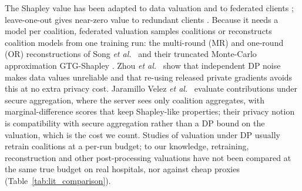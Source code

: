 \documentclass[journal]{IEEEtran}
\begin{document}
The Shapley value \cite{Shapley1953} has been adapted to data valuation \cite{Ghorbani2019DataShapley, Jia2019KNNShapley} and to federated clients \cite{Song2019BlockchainFL, Wei2020DataValuation, Lyu2020FairnessFL}; leave-one-out gives near-zero value to redundant clients \cite{Ghorbani2019DataShapley}. Because it needs a model per coalition, federated valuation samples coalitions \cite{Maleki2013Bounding, Jia2020EfficientShapley} or reconstructs coalition models from one training run: the multi-round (MR) and one-round (OR) reconstructions of Song \emph{et al.}\ \cite{Song2019BlockchainFL} and their truncated Monte-Carlo approximation GTG-Shapley \cite{Liu2022GTG}. Zhou \emph{et al.}\ \cite{Zhou2025Data} show that independent DP noise makes data values unreliable and that re-using released private gradients avoids this at no extra privacy cost. Jaramillo Velez \emph{et al.}\ \cite{JaramilloVelez2026Beyond} evaluate contributions under secure aggregation, where the server sees only coalition aggregates, with marginal-difference scores that keep Shapley-like properties; their privacy notion is compatibility with secure aggregation rather than a DP bound on the valuation, which is the cost we count. Studies of valuation under DP usually retrain coalitions at a per-run budget; to our knowledge, retraining, reconstruction and other post-processing valuations have not been compared at the same true budget on real hospitals, nor against cheap proxies (Table~\ref{tab:lit_comparison}).
\end{document}

